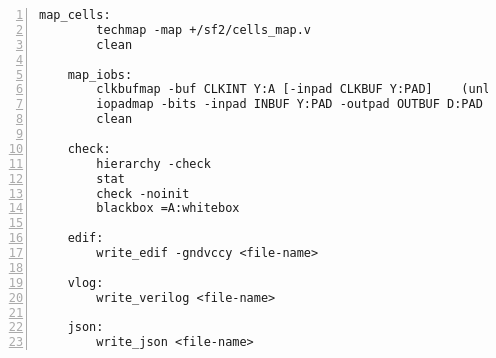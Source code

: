 \begin{lstlisting}[numbers=left,frame=single]
    map_cells:
        techmap -map +/sf2/cells_map.v
        clean

    map_iobs:
        clkbufmap -buf CLKINT Y:A [-inpad CLKBUF Y:PAD]    (unless -noiobs, -inpad only passed if -clkbuf)
        iopadmap -bits -inpad INBUF Y:PAD -outpad OUTBUF D:PAD -toutpad TRIBUFF E:D:PAD -tinoutpad BIBUF E:Y:D:PAD    (unless -noiobs
        clean

    check:
        hierarchy -check
        stat
        check -noinit
        blackbox =A:whitebox

    edif:
        write_edif -gndvccy <file-name>

    vlog:
        write_verilog <file-name>

    json:
        write_json <file-name>
\end{lstlisting}

